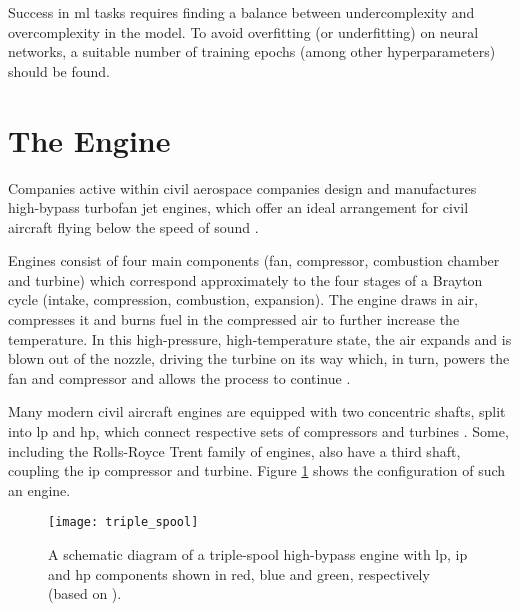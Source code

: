 Success in \ac{ml} tasks requires finding a balance between undercomplexity and overcomplexity in the model. To avoid overfitting (or underfitting) on neural networks, a suitable number of training epochs (among other hyperparameters) should be found.

\section{The Engine}
Companies active within civil aerospace companies design and manufactures high-bypass turbofan jet engines, which offer an ideal arrangement for civil aircraft flying below the speed of sound \cite[]{rolls-royce_plc_jet_2015}.

Engines consist of four main components (fan, compressor, combustion chamber and turbine) which correspond approximately to the four stages of a Brayton cycle (intake, compression, combustion, expansion). The engine draws in air, compresses it and burns fuel in the compressed air to further increase the temperature. In this high-pressure, high-temperature state, the air expands and is blown out of the nozzle, driving the turbine on its way which, in turn, powers the fan and compressor and allows the process to continue \cite[]{rolls-royce_plc_jet_2015}.

Many modern civil aircraft engines are equipped with two concentric shafts, split into \ac{lp} and \ac{hp}, which connect respective sets of compressors and turbines \cite[]{spittle_gas_2003}. Some, including the Rolls-Royce Trent family of engines, also have a third shaft, coupling the \ac{ip} compressor and turbine. Figure \ref{fig:triple_spool} shows the configuration of such an engine.

\begin{figure}
    \centering
    \texttt{[image: triple\_spool]}
    \caption{\label{fig:triple_spool} A schematic diagram of a triple-spool high-bypass engine with \ac{lp}, \ac{ip} and \ac{hp} components shown in red, blue and green, respectively (based on \protect\citet{rolls-royce_plc_jet_2015}).}
\end{figure}

